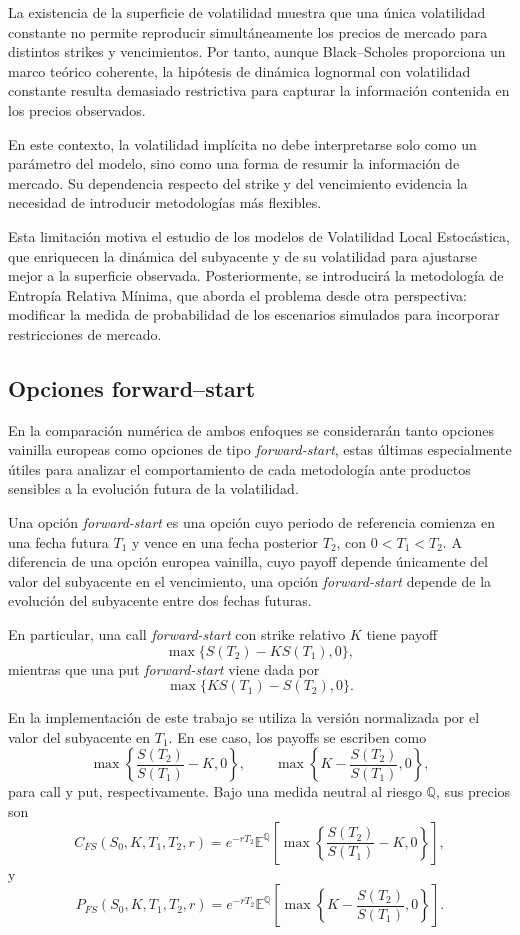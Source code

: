 La existencia de la superficie de volatilidad muestra que una única volatilidad constante no permite reproducir simultáneamente los precios de mercado para distintos strikes y vencimientos. Por tanto, aunque Black--Scholes proporciona un marco teórico coherente, la hipótesis de dinámica lognormal con volatilidad constante resulta demasiado restrictiva para capturar la información contenida en los precios observados.

En este contexto, la volatilidad implícita no debe interpretarse solo como un parámetro del modelo, sino como una forma de resumir la información de mercado. Su dependencia respecto del strike y del vencimiento evidencia la necesidad de introducir metodologías más flexibles.\medskip

Esta limitación motiva el estudio de los modelos de Volatilidad Local Estocástica, que enriquecen la dinámica del subyacente y de su volatilidad para ajustarse mejor a la superficie observada. Posteriormente, se introducirá la metodología de Entropía Relativa Mínima, que aborda el problema desde otra perspectiva: modificar la medida de probabilidad de los escenarios simulados para incorporar restricciones de mercado.\medskip

\subsection{Opciones forward--start}
\label{sec:forward_start}
En la comparación numérica de ambos enfoques se considerarán tanto opciones vainilla europeas como opciones de tipo \textit{forward-start}, estas últimas especialmente útiles para analizar el comportamiento de cada metodología ante productos sensibles a la evolución futura de la volatilidad.\medskip

Una opción \textit{forward-start} es una opción cuyo periodo de referencia comienza en una fecha futura \(T_1\) y vence en una fecha posterior \(T_2\), con \(0<T_1<T_2\). A diferencia de una opción europea vainilla, cuyo payoff depende únicamente del valor del subyacente en el vencimiento, una opción \textit{forward-start} depende de la evolución del subyacente entre dos fechas futuras.

En particular, una call \textit{forward-start} con strike relativo \(K\) tiene payoff
\[
\max\{S(T_2)-K S(T_1),0\},
\]
mientras que una put \textit{forward-start} viene dada por
\[
\max\{K S(T_1)-S(T_2),0\}.
\]

En la implementación de este trabajo se utiliza la versión normalizada por el valor del subyacente en \(T_1\). En ese caso, los payoffs se escriben como
\[
\max\left\{\frac{S(T_2)}{S(T_1)}-K,0\right\},
\qquad
\max\left\{K-\frac{S(T_2)}{S(T_1)},0\right\},
\]
para call y put, respectivamente. Bajo una medida neutral al riesgo \(\mathbb{Q}\), sus precios son
\[
C_{FS}(S_0,K,T_1,T_2,r)
=
e^{-rT_2}
\mathbb{E}^{\mathbb{Q}}
\left[
\max\left\{\frac{S(T_2)}{S(T_1)}-K,0\right\}
\right],
\]
y
\[
P_{FS}(S_0,K,T_1,T_2,r)
=
e^{-rT_2}
\mathbb{E}^{\mathbb{Q}}
\left[
\max\left\{K-\frac{S(T_2)}{S(T_1)},0\right\}
\right].
\]

